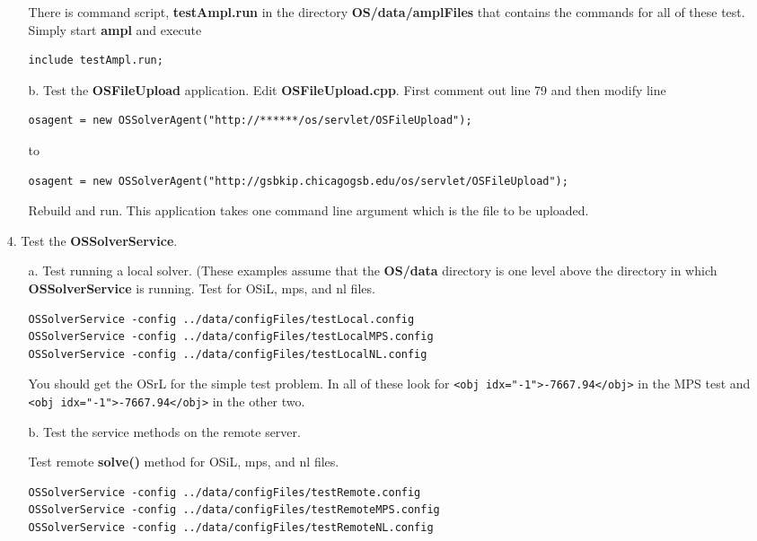 \begin{itemize}
\begin{itemize}
There is command script, {\bf testAmpl.run} in the directory {\bf OS/data/amplFiles} that contains the commands for all of these test. Simply start {\bf ampl} and execute
\begin{verbatim}
include testAmpl.run;
\end{verbatim}



\item[b.] Test the {\bf OSFileUpload} application.    Edit  {\bf OSFileUpload.cpp}. First comment out line 79 and then modify line 
\begin{verbatim}
osagent = new OSSolverAgent("http://******/os/servlet/OSFileUpload");
\end{verbatim}
to
{\small
\begin{verbatim}
osagent = new OSSolverAgent("http://gsbkip.chicagogsb.edu/os/servlet/OSFileUpload");
\end{verbatim}
}
Rebuild and run. This application takes one command line argument which is the file to be uploaded. 

\end{itemize}

\item[4.] Test the {\bf OSSolverService}.

\begin{itemize}
\item[a.] Test running a local solver.  (These examples assume that the {\bf OS/data} directory is one level above the directory  in which {\bf OSSolverService} is running. Test  for OSiL, mps, and nl files.

\begin{verbatim}
OSSolverService -config ../data/configFiles/testLocal.config
OSSolverService -config ../data/configFiles/testLocalMPS.config
OSSolverService -config ../data/configFiles/testLocalNL.config
\end{verbatim}


You should get the OSrL for the simple test problem.   In all of these look for {\tt <obj idx="-1">-7667.94</obj>} in the MPS test and {\tt <obj idx="-1">-7667.94</obj>} in the other two.


\item[b.]  Test the service methods on the remote server.  


 Test remote {\bf solve()} method for OSiL, mps, and nl files.



\begin{verbatim}
OSSolverService -config ../data/configFiles/testRemote.config
OSSolverService -config ../data/configFiles/testRemoteMPS.config
OSSolverService -config ../data/configFiles/testRemoteNL.config
\end{verbatim}



\end{itemize}
\end{itemize}
